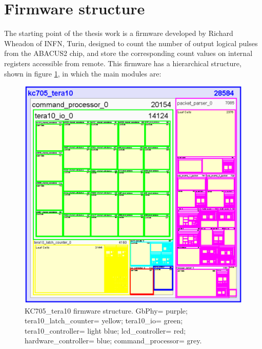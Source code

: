 \section{Firmware structure}\label{structure}
\noindent The starting point of the thesis work is a firmware developed by Richard Wheadon of INFN, Turin, designed to count the number of output logical pulses from the ABACUS2 chip, and store the corresponding count values on internal registers accessible from remote. This firmware has a hierarchical structure, shown in figure \ref{fig:tera10}, in which the main modules are:
\begin{figure}[H]
	\centering
	\includegraphics[width=0.75\linewidth]{IMG/ch4/HIERARCHY5}
	\caption{KC705\_tera10 firmware structure. GbPhy= purple; tera10\_latch\_counter= yellow; tera10\_io= green; tera10\_controller= light blue; lcd\_controller= red; hardware\_controller= blue; command\_processor= grey.}
	\label{fig:tera10}
\end{figure}
